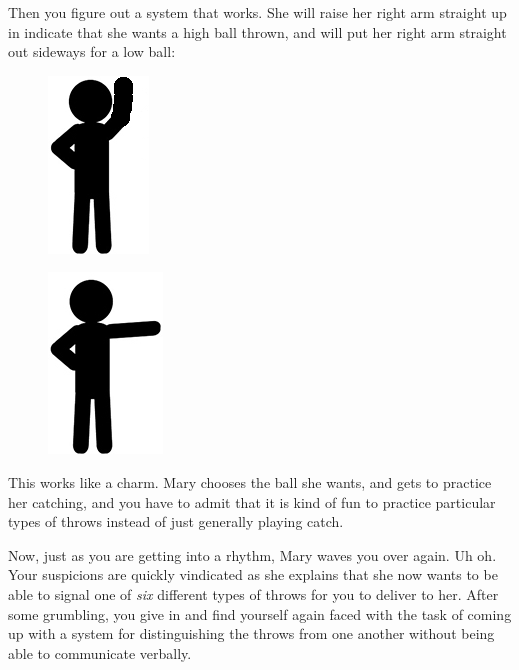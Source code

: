 \documentclass[UTF8]{book}
\begin{document}
\begin{CJK}{UTF8}{gbsn}
Then you figure out a system that works. She will raise her right arm straight up in indicate that she wants a high ball thrown, and will put her right arm straight out sideways for a low ball:

\begin{figure}[H]
\centering
\captionsetup{labelformat=empty}
\begin{minipage}{.4\textwidth}
  \centering
  \includegraphics[width=.3\linewidth]{stick-figure-arm-raised}
  \label{fig:test1}
\end{minipage}%
\begin{minipage}{.4\textwidth}
  \centering
  \includegraphics[width=.3\linewidth]{stick-figure-arm-sideways}
  \label{fig:test2}
\end{minipage}
\end{figure}

This works like a charm. Mary chooses the ball she wants, and gets to practice her catching, and you have to admit that it is kind of fun to practice particular types of throws instead of just generally playing catch.

Now, just as you are getting into a rhythm, Mary waves you over again. Uh oh. Your suspicions are quickly vindicated as she explains that she now wants to be able to signal one of \emph{six} different types of throws for you to deliver to her. After some grumbling, you give in and find yourself again faced with the task of coming up with a system for distinguishing the throws from one another without being able to communicate verbally.


\end{CJK}
\end{document}
